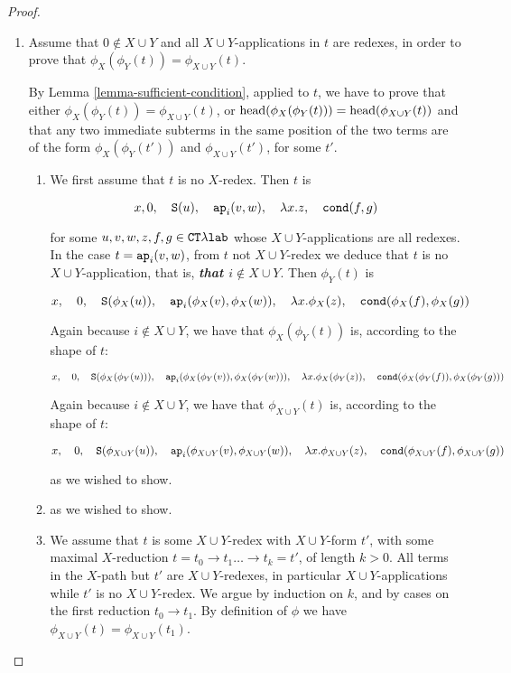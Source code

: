 \begin{proof}
\begin{enumerate}
\item
Assume that $0 \not \in X \cup Y$ and all $X \cup Y$-applications in $t$ are redexes, 
in order to prove that $\phi_{X}(\phi_{Y}(t)) = \phi_{X \cup Y}(t)$.

By Lemma \ref{lemma-sufficient-condition}, applied to $t$, we have to prove that
either $\phi_{X}(\phi_{Y}(t)) = \phi_{X \cup Y}(t)$, or
${\rm head}( \phi_{X}(\phi_{Y}(t)) ) = {\rm head}( \phi_{X \cup Y}(t) )$ 
and that any two immediate subterms in the same position of the two terms 
are of the form $\phi_{X}(\phi_{Y}(t')) $ and $\phi_{X \cup Y}(t')$, for some $t'$.

\begin{enumerate}
\item
We first assume that $t$ is no $X$-redex. Then $t$ is

$$ 
x, 
0, \ \ \  
{\tt S}(u),  \ \ \  
{\tt ap}_i(v,w), \ \ \  
\lambda x.z, \ \ \  
{\tt cond}(f,g)
$$

for some $u,v,w,z,f,g \in { { {\tt CT}\lambda} \mbox{\tt lab}}$ whose $X \cup Y$-applications are all redexes.
In the case $t = {\tt ap}_i(v,w)$, from $t$ not $X \cup Y$-redex we deduce that $t$ is no
$X \cup Y$-application, that is, \emph{\bf that $i \not \in X \cup Y$}. 
Then $\phi_{Y}(t)$ is

$$ 
x, \ \ \ 
0, \ \ \  
\Succ(\phi_X(u)),  \ \ \  
\ap_i(\phi_X(v), \phi_X(w)), \ \ \  
\lambda x.\phi_X(z), \ \ \  
\cond(\phi_X(f), \phi_X(g))
$$

Again because $i \not \in X \cup Y$, 
we have that $\phi_{X}(\phi_{Y}(t))$ is, according to the shape of $t$:

$$ 
x, \ \ \ 
0, \ \ \  
\Succ(   \phi_X(\phi_Y(u))   ),  \ \ \  
\ap_i(  \phi_X(\phi_Y(v)),   \phi_X(\phi_Y(w))   ) , \ \ \  
\lambda x.   \phi_X(\phi_Y(z)), \ \ \  
\cond(   \phi_X(\phi_Y(f)), \phi_X(\phi_Y(g))  )
$$

Again because $i \not \in X \cup Y$, 
we have that $\phi_{X \cup Y}(t)$ is, according to the shape of $t$:

$$ 
x, \ \ \ 
0, \ \ \  
\Succ( \phi_{X \cup Y}(u)  ),  \ \ \  
\ap_i(  \phi_{X \cup Y}(v),   \phi_{X \cup Y}(w)   ) , \ \ \  
\lambda x.   \phi_{X \cup Y}(z), \ \ \  
\cond(   \phi_{X \cup Y}(f), \phi_{X \cup Y}(g)  )
$$

as we wished to show.

\item
as we wished to show.

\item
We assume that $t$ is some $X \cup Y$-redex with $X \cup Y$-form $t'$, 
with some maximal $X$-reduction
$t=t_0 \rightarrow t_1 \ldots \rightarrow t_k = t'$, of length $k>0$. All terms  
in the $X$-path but $t'$ are $X \cup Y$-redexes, in particular $X \cup Y$-applications
while $t'$ is no $X \cup Y$-redex. We argue by induction on $k$, 
and by cases on the first reduction $t_0 \rightarrow t_1$. 
By definition of $\phi$ we have $\phi_{X \cup Y}(t) = \phi_{X \cup Y}(t_1)$. 


\end{enumerate}
\end{enumerate}
\end{proof}
